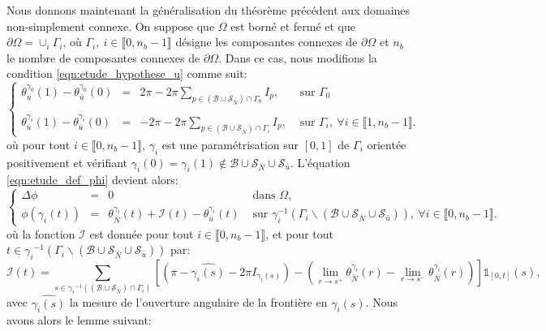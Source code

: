 Nous donnons maintenant la généralisation du théorème précédent aux domaines non-simplement connexe. On suppose que $\Omega$ est borné et fermé et que $\partial\Omega=\cup_i\Gamma_i$, où $\Gamma_i,~i\in\llbracket 0, n_b-1\rrbracket$ désigne les composantes connexes de $\partial\Omega$ et $n_b$ le nombre de composantes connexes de $\partial\Omega$. Dans ce cas, nous modifions la condition \eqref{eqn:etude_hypothese_u} comme suit:
\begin{equation}
    \left\{
    \begin{array}{lcll}
    \theta_{\bar{u}}^{\gamma_0}(1)-\theta_{\bar{u}}^{\gamma_0}(0)&=&2\pi-2\pi\displaystyle\sum_{p\in(\mathcal{B}\cup\mathcal{S}_{\bar{N}})\cap\Gamma_0}I_p,&\mbox{ sur }\Gamma_0\\\\
    \theta_{\bar{u}}^{\gamma_i}(1)-\theta_{\bar{u}}^{\gamma_i}(0)&=&-2\pi-2\pi\displaystyle\sum_{p\in(\mathcal{B}\cup\mathcal{S}_{\bar{N}})\cap\Gamma_i}I_p,&\mbox{ sur }\Gamma_i,~\forall i\in\llbracket 1, n_b-1\rrbracket.
    \end{array}
    \right.
    \label{eqn:etude_hypothese_u_second}
\end{equation}
où pour tout $i\in\llbracket0, n_b-1\rrbracket$, $\gamma_i$ est une paramétrisation sur $[0, 1]$ de $\Gamma_i$ orientée positivement et vérifiant $\gamma_i(0)=\gamma_i(1)\notin\mathcal{B}\cup\mathcal{S}_{\bar{N}}\cup\mathcal{S}_{\bar{u}}$. L'équation \eqref{eqn:etude_def_phi} devient alors:
\begin{equation}
\left\{
\begin{array}{lcll}
\Delta\phi &=& 0 &\mbox{ dans }\Omega,\\[0.5cm]
\phi(\gamma_i(t))&=&\theta_{\bar{N}}^{\gamma_i}(t)+\mathcal{I}(t)-\theta_{\bar{u}}^{\gamma_i}(t) & \mbox{ sur } \gamma_i^{-1}(\Gamma_i\backslash(\mathcal{B}\cup\mathcal{S}_{\bar{N}}\cup\mathcal{S}_{\bar{u}})),~\forall i\in\llbracket 0, n_b-1\rrbracket.
\end{array}
\right.
\end{equation}
où la fonction $\mathcal{I}$ est donnée pour tout $i\in\llbracket0, n_b-1\rrbracket$, et pour tout $t\in{\gamma_i}^{-1}(\Gamma_i\backslash(\mathcal{B}\cup\mathcal{S}_{\bar{N}}\cup\mathcal{S}_{\bar{u}}))$ par:
$$
\mathcal{I}(t)=\sum_{s\in{\gamma_i}^{-1}((\mathcal{B}\cup\mathcal{S}_{\bar{N}})\cap\Gamma_i)}\left[\left(\pi-\widehat{\gamma_i(s)}-2\pi I_{\gamma_i(s)}\right)-\left(\lim\limits_{r\rightarrow s^+}\theta^{\gamma_i}_{\bar{N}}(r) - \lim\limits_{r\rightarrow s^-}\theta^{\gamma_i}_{\bar{N}}(r)\right)\right]\mathbb{1}_{[0, t]}(s),
$$
avec $\widehat{\gamma_i(s)}$ la mesure de l'ouverture angulaire de la frontière en $\gamma_i(s)$. Nous avons alors le lemme suivant:

